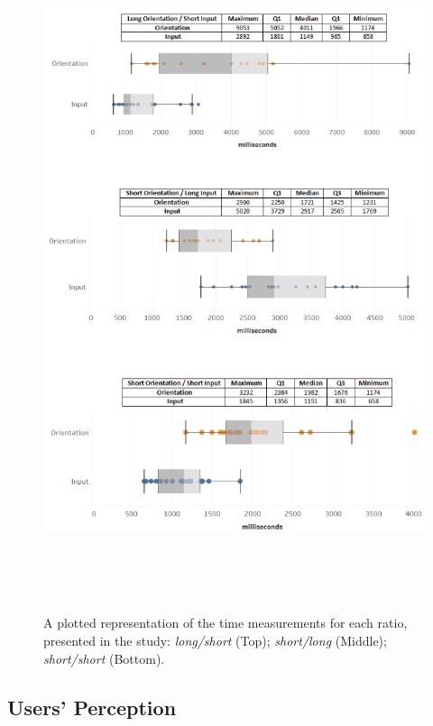 \begin{figure}[t!]
\centering
\includegraphics[width=14cm, height=20cm]{Chapters/graphics/Times.png}
\caption{A plotted representation of the time measurements for each ratio, presented in the study: \textit{long/short} (Top);  \textit{short/long} (Middle); \textit{short/short} (Bottom).}
\label{fig:times}
\end{figure}

\subsection{Users' Perception}

